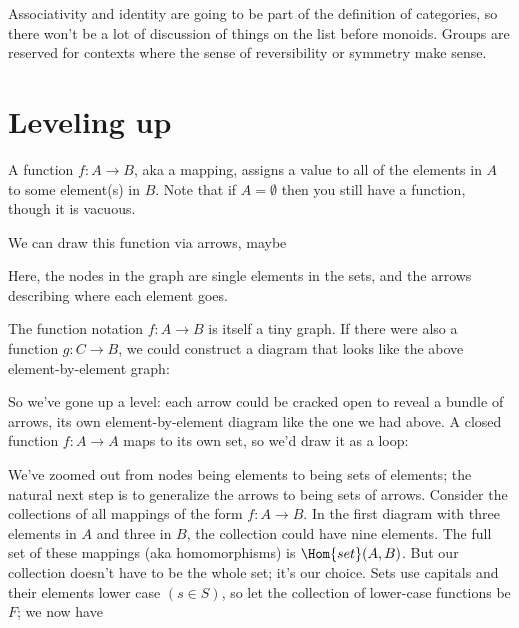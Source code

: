 \documentclass[11pt]{article}
\begin{document}
Associativity and identity are going to be part of the definition of categories,
so there won't be a lot of discussion of things on the list before monoids.
Groups are reserved for contexts where the sense of reversibility or symmetry make sense.

\section{Leveling up}\label{levelsec}

A function $f:A\to B$, aka a mapping, assigns a value to all of the elements in $A$ to
some element(s) in $B$. Note that if $A=\emptyset$ then you still have a function, though
it is vacuous.

We can draw this function via arrows, maybe

\begin{center}
\end{center}

Here, the nodes in the graph are single elements in the sets, and the arrows describing
where each element goes.

The function notation $f:A\to B$ is itself a tiny graph. If there were also a function
$g:C\to B$, we could construct a diagram that looks like the above element-by-element graph:

So we've gone up a level: each arrow could be cracked open to reveal a bundle of arrows,
its own element-by-element diagram like the one we had above. A closed function $f:A\to A$ maps to its
own set, so we'd draw it as a loop:


We've zoomed out from nodes being elements to being sets of elements; the natural next
step is to generalize the arrows to being sets of arrows. Consider the collections of all
mappings of the form $f:A\to B$. In the first diagram with three elements in $A$ and
three in $B$, the collection could have nine elements. The full set of these mappings (aka
homomorphisms) is $\Hom{set}(A, B)$. But our collection doesn't have to be the whole set;
it's our choice. Sets use capitals and their elements lower case $(s\in S)$, so let
the collection of lower-case functions be $F$; we now have
\end{document}
